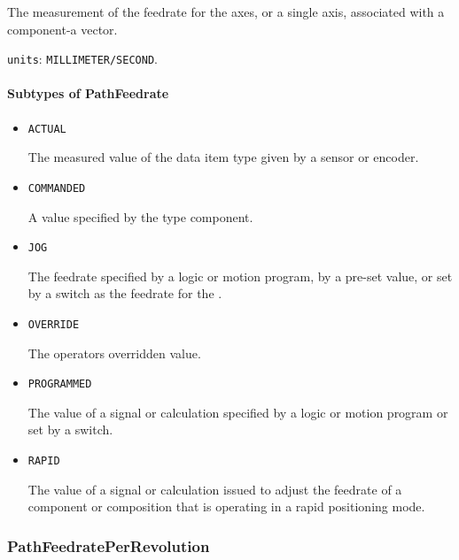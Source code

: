 The measurement of the feedrate for the axes, or a single axis, associated with a  component-a vector.


\texttt{units}: \texttt{MILLIMETER/SECOND}.

\paragraph{Subtypes of PathFeedrate}\mbox{}
\label{sec:Subtypes of PathFeedrate}

\begin{itemize}

\item \texttt{ACTUAL}


The measured value of the data item type given by a sensor or encoder.

\item \texttt{COMMANDED}


A value specified by the  type component.

\item \texttt{JOG}


The feedrate specified by a logic or motion program, by a pre-set value, or set by a switch as the feedrate for the . 

\item \texttt{OVERRIDE}


The operators overridden value.

\item \texttt{PROGRAMMED}


The value of a signal or calculation specified by a logic or motion program or set by a switch.

\item \texttt{RAPID}


The value of a signal or calculation issued to adjust the feedrate of a component or composition that is operating in a rapid positioning mode.


\end{itemize}









\subsubsection{PathFeedratePerRevolution}
\label{sec:PathFeedratePerRevolution}



